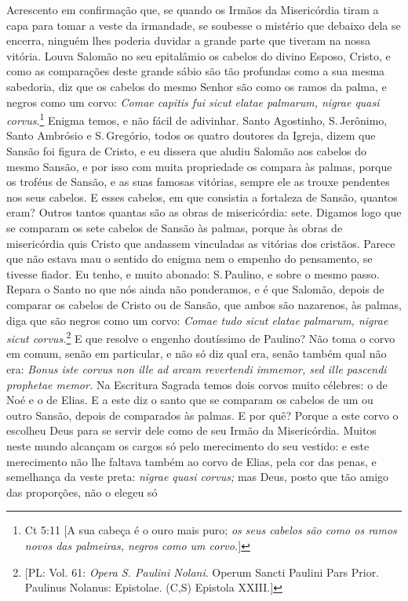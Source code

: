 Acrescento em confirmação que, se quando os Irmãos da Misericórdia tiram
a capa para tomar a veste da irmandade, se soubesse o mistério que
debaixo dela se encerra, ninguém lhes poderia duvidar a grande parte que
tiveram na nossa vitória. Louva Salomão no seu epitalâmio os cabelos do
divino Esposo, Cristo, e como as comparações deste grande sábio são tão
profundas como a sua mesma sabedoria, diz que os cabelos do mesmo Senhor
são como os ramos da palma, e negros como um corvo: \emph{Comae capitis
fui sicut elatae palmarum, nigrae quasi corvus}.\footnote{Ct 5:11 [A sua cabeça é o ouro mais puro; \textit{os seus cabelos são como os ramos novos das palmeiras, negros como um corvo.}]} Enigma
temos, e não fácil de adivinhar. Santo Agostinho, S.\,Jerônimo, Santo
Ambrósio e S.\,Gregório, todos os quatro doutores da Igreja, dizem que
Sansão foi figura de Cristo, e eu dissera que aludiu Salomão aos cabelos
do mesmo Sansão, e por isso com muita propriedade os compara às palmas,
porque os troféus de Sansão, e as suas famosas vitórias, sempre ele as
trouxe pendentes nos seus cabelos. E esses cabelos, em que consistia a
fortaleza de Sansão, quantos eram? Outros tantos quantas são as obras de
misericórdia: sete. Digamos logo que se comparam os sete cabelos de
Sansão às palmas, porque às obras de misericórdia quis Cristo que
andassem vinculadas as vitórias dos cristãos. Parece que não estava mau
o sentido do enigma nem o empenho do pensamento, se tivesse fiador. Eu
tenho, e muito abonado: S.\,Paulino, e sobre o mesmo passo. Repara o
Santo no que nós ainda não ponderamos, e é que Salomão, depois de
comparar os cabelos de Cristo ou de Sansão, que ambos são nazarenos,
às palmas, diga que são negros como um corvo: \emph{Comae tudo sicut
elatae palmarum, nigrae sicut corvus.}\footnote{[PL: Vol. 61: \textit{Opera S. Paulini Nolani}. Operum Sancti Paulini Pars Prior. Paulinus Nolanus: Epistolae. (C,S) Epistola XXIII.]} E que resolve o engenho
doutíssimo de Paulino?
Não toma o corvo em comum, senão em particular, e não só diz qual era,
senão também qual não era: \emph{Bonus iste corvus non ille ad arcam
revertendi immemor, sed ille pascendi prophetae memor.} Na Escritura
Sagrada temos dois corvos muito célebres: o de Noé e o de Elias. E a
este diz o santo que se comparam os cabelos de um ou outro Sansão,
depois de comparados às palmas. E por quê? Porque a este corvo o
escolheu Deus para se servir dele como de seu Irmão da Misericórdia.
Muitos neste mundo alcançam os cargos só pelo merecimento do seu
vestido: e este merecimento não lhe faltava também ao corvo de Elias,
pela cor das penas, e semelhança da veste preta: \emph{nigrae quasi
corvus;} mas Deus, posto que tão amigo das proporções, não o elegeu só
